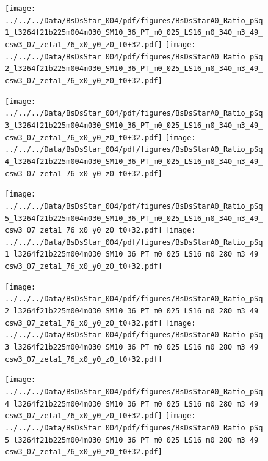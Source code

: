 \documentclass[a4paper,10pt]{article}
\begin{document}
\begin{figure}[p]
 \texttt{[image: ../../../Data/BsDsStar\_004/pdf/figures/BsDsStarA0\_Ratio\_pSq1\_l3264f21b225m004m030\_SM10\_36\_PT\_m0\_025\_LS16\_m0\_340\_m3\_49\_csw3\_07\_zeta1\_76\_x0\_y0\_z0\_t0+32.pdf]} 
 \texttt{[image: ../../../Data/BsDsStar\_004/pdf/figures/BsDsStarA0\_Ratio\_pSq2\_l3264f21b225m004m030\_SM10\_36\_PT\_m0\_025\_LS16\_m0\_340\_m3\_49\_csw3\_07\_zeta1\_76\_x0\_y0\_z0\_t0+32.pdf]} 
 \end{figure}
\begin{figure}[p]
 \texttt{[image: ../../../Data/BsDsStar\_004/pdf/figures/BsDsStarA0\_Ratio\_pSq3\_l3264f21b225m004m030\_SM10\_36\_PT\_m0\_025\_LS16\_m0\_340\_m3\_49\_csw3\_07\_zeta1\_76\_x0\_y0\_z0\_t0+32.pdf]} 
 \texttt{[image: ../../../Data/BsDsStar\_004/pdf/figures/BsDsStarA0\_Ratio\_pSq4\_l3264f21b225m004m030\_SM10\_36\_PT\_m0\_025\_LS16\_m0\_340\_m3\_49\_csw3\_07\_zeta1\_76\_x0\_y0\_z0\_t0+32.pdf]} 
 \end{figure}
\begin{figure}[p]
 \texttt{[image: ../../../Data/BsDsStar\_004/pdf/figures/BsDsStarA0\_Ratio\_pSq5\_l3264f21b225m004m030\_SM10\_36\_PT\_m0\_025\_LS16\_m0\_340\_m3\_49\_csw3\_07\_zeta1\_76\_x0\_y0\_z0\_t0+32.pdf]} 
 \texttt{[image: ../../../Data/BsDsStar\_004/pdf/figures/BsDsStarA0\_Ratio\_pSq1\_l3264f21b225m004m030\_SM10\_36\_PT\_m0\_025\_LS16\_m0\_280\_m3\_49\_csw3\_07\_zeta1\_76\_x0\_y0\_z0\_t0+32.pdf]} 
 \end{figure}
\clearpage
\begin{figure}[p]
 \texttt{[image: ../../../Data/BsDsStar\_004/pdf/figures/BsDsStarA0\_Ratio\_pSq2\_l3264f21b225m004m030\_SM10\_36\_PT\_m0\_025\_LS16\_m0\_280\_m3\_49\_csw3\_07\_zeta1\_76\_x0\_y0\_z0\_t0+32.pdf]} 
 \texttt{[image: ../../../Data/BsDsStar\_004/pdf/figures/BsDsStarA0\_Ratio\_pSq3\_l3264f21b225m004m030\_SM10\_36\_PT\_m0\_025\_LS16\_m0\_280\_m3\_49\_csw3\_07\_zeta1\_76\_x0\_y0\_z0\_t0+32.pdf]} 
 \end{figure}
\begin{figure}[p]
 \texttt{[image: ../../../Data/BsDsStar\_004/pdf/figures/BsDsStarA0\_Ratio\_pSq4\_l3264f21b225m004m030\_SM10\_36\_PT\_m0\_025\_LS16\_m0\_280\_m3\_49\_csw3\_07\_zeta1\_76\_x0\_y0\_z0\_t0+32.pdf]} 
 \texttt{[image: ../../../Data/BsDsStar\_004/pdf/figures/BsDsStarA0\_Ratio\_pSq5\_l3264f21b225m004m030\_SM10\_36\_PT\_m0\_025\_LS16\_m0\_280\_m3\_49\_csw3\_07\_zeta1\_76\_x0\_y0\_z0\_t0+32.pdf]} 
 \end{figure}
\clearpage
\end{document}
